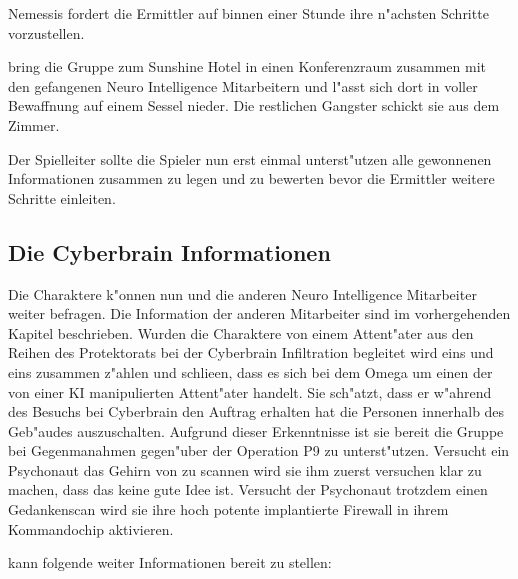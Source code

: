 Nemessis fordert die Ermittler auf binnen einer Stunde ihre n"achsten Schritte vorzustellen. 


\xl{} bring die Gruppe zum Sunshine Hotel in einen Konferenzraum zusammen mit den gefangenen Neuro Intelligence Mitarbeitern und l"asst sich dort in voller Bewaffnung auf einem Sessel nieder. Die restlichen Gangster schickt sie aus dem Zimmer.

Der Spielleiter sollte die Spieler nun erst einmal unterst"utzen alle gewonnenen Informationen zusammen zu legen und zu bewerten bevor die Ermittler weitere Schritte einleiten. 

\subsection{Die Cyberbrain Informationen} 
Die Charaktere k"onnen nun \ml{} und die anderen Neuro Intelligence Mitarbeiter weiter befragen. Die Information der anderen Mitarbeiter sind im vorhergehenden Kapitel beschrieben. Wurden die Charaktere von einem Attent"ater aus den Reihen des Protektorats bei der Cyberbrain Infiltration begleitet wird \ml{} eins und eins zusammen z"ahlen und schlie\3en, dass es sich bei dem Omega um einen der von einer KI manipulierten Attent"ater handelt. Sie sch"atzt, dass er w"ahrend des Besuchs bei Cyberbrain den Auftrag erhalten hat die Personen innerhalb des Geb"audes auszuschalten. Aufgrund dieser Erkenntnisse ist sie bereit die Gruppe bei Gegenma\3nahmen gegen"uber der Operation P9 zu unterst"utzen. Versucht ein Psychonaut das Gehirn von \ml{} zu scannen wird sie ihm zuerst versuchen klar zu machen, dass das keine gute Idee ist. Versucht der Psychonaut trotzdem einen Gedankenscan wird sie ihre hoch potente implantierte Firewall in ihrem Kommandochip aktivieren.

\ml{} kann folgende weiter Informationen bereit zu stellen:

